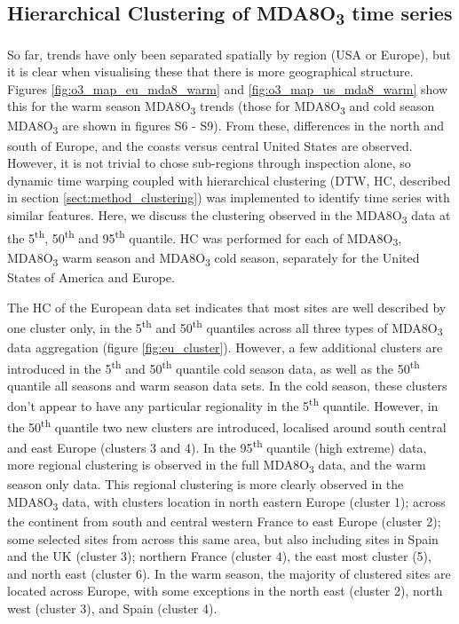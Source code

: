\documentclass[journal abbreviation, manuscript]{copernicus}
\begin{document}

\subsection{Hierarchical Clustering of MDA8O\textsubscript{3} time series} \label{sect:clustering}

So far, trends have only been separated spatially by region (USA or Europe), but it is clear when visualising these that there is more geographical structure. Figures \ref{fig:o3_map_eu_mda8_warm} and \ref{fig:o3_map_us_mda8_warm} show this for the warm season MDA8O\textsubscript{3} trends (those for MDA8O\textsubscript{3} and cold season MDA8O\textsubscript{3} are shown in figures S6 - S9). From these, differences in the north and south of Europe, and the coasts versus central United States are observed. However, it is not trivial to chose sub-regions through inspection alone, so dynamic time warping coupled with hierarchical clustering (DTW, HC, described in section \ref{sect:method_clustering}) was implemented to identify time series with similar features. Here, we discuss the clustering observed in the MDA8O\textsubscript{3} data at the 5\textsuperscript{th}, 50\textsuperscript{th} and 95\textsuperscript{th} quantile. HC was performed for each of MDA8O\textsubscript{3}, MDA8O\textsubscript{3} warm season and MDA8O\textsubscript{3} cold season, separately for the United States of America and Europe. 

The HC of the European data set indicates that most sites are well described by one cluster only, in the 5\textsuperscript{th} and 50\textsuperscript{th} quantiles across all three types of MDA8O\textsubscript{3} data aggregation (figure \ref{fig:eu_cluster}). However, a few additional clusters are introduced in the 5\textsuperscript{th} and 50\textsuperscript{th} quantile cold season data, as well as the 50\textsuperscript{th} quantile all seasons and warm season data sets. In the cold season, these clusters don't appear to have any particular regionality in the 5\textsuperscript{th} quantile. However, in the 50\textsuperscript{th} quantile two new clusters are introduced, localised around south central and east Europe (clusters 3 and 4). In the 95\textsuperscript{th} quantile (high extreme) data, more regional clustering is observed in the full MDA8O\textsubscript{3} data, and the warm season only data. This regional clustering is more clearly observed in the MDA8O\textsubscript{3} data, with clusters location in north eastern Europe (cluster 1); across the continent from south and central western France to east Europe (cluster 2); some selected sites from across this same area, but also including sites in Spain and the UK (cluster 3); northern France (cluster 4), the east most cluster (5), and north east (cluster 6). In the warm season, the majority of clustered sites are located across Europe, with some exceptions in the north east (cluster 2), north west (cluster 3), and Spain (cluster 4).
\end{document}
